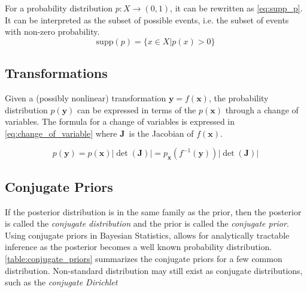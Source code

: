 For a probability distribution $p: X \to (0, 1)$, it can be rewritten as \cref{eq:supp_p}. It can be interpreted as the subset of possible events, i.e. the subset of events with non-zero probability. 
\begin{equation}\label{eq:supp_p}
    \text{supp}(p) = \{ x \in X | p(x) > 0 \}
\end{equation}

\subsection{Transformations}
Given a (possibly nonlinear) transformation $\mathbf{y} = f(\mathbf{x})$, the probability distribution $p(\mathbf{y})$ can be expressed in terms of the $p(\mathbf{x})$ through a change of variables. The formula for a change of variables is expressed in \cref{eq:change_of_variable} where $\boldsymbol{J}$ is the Jacobian of $f(\mathbf{x})$.

\begin{equation}\label{eq:change_of_variable}
    p(\mathbf{y}) = p(\mathbf{x}) | \det (\mathbf{J}) | = p_{\mathbf{x}}(f^{-1}(\mathbf{y})) | \det (\mathbf{J}) |  
\end{equation}

\subsection{Conjugate Priors}\label{sec:theory_conjugate_priors}
If the posterior distribution is in the same family as the prior, then the posterior is called the \textit{conjugate distribution} and the prior is called the \textit{conjugate prior}. Using conjugate priors in Bayesian Statistics, allows for analytically tractable inference as the posterior becomes a well known probability distribution. \cref{table:conjugate_priors} summarizes the conjugate priors for a few common distribution. Non-standard distribution may still exist as conjugate distributions, such as the \textit{conjugate Dirichlet}


